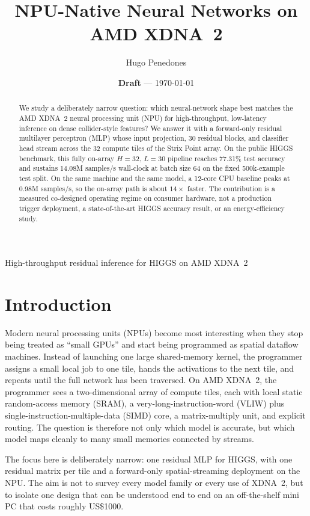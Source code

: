 \documentclass[a4paper,11pt]{article}
\title{NPU-Native Neural Networks on AMD XDNA~2}
\author{Hugo Penedones}
\date{\textbf{Draft} --- \today}
\begin{document}
\maketitle

\begin{center}
\large\color{black!70} High-throughput residual inference for HIGGS on AMD XDNA~2
\end{center}

\begin{abstract}
We study a deliberately narrow question: which neural-network shape best
matches the AMD XDNA~2 neural processing unit (NPU) for high-throughput,
low-latency inference on dense collider-style features? We answer it with a
forward-only residual multilayer perceptron (MLP) whose input projection, 30
residual blocks, and classifier head stream across the 32 compute tiles of the
Strix Point array. On the public HIGGS benchmark, this fully on-array
$H=32$, $L=30$ pipeline reaches 77.31\% test accuracy and sustains 14.08M
samples/s wall-clock at batch size 64 on the fixed 500k-example test split. On
the same machine and the same model, a 12-core CPU baseline peaks at
0.98M samples/s, so the on-array
path is about $14\times$ faster. The contribution is a measured co-designed
operating regime on consumer hardware, not a production trigger deployment, a
state-of-the-art HIGGS accuracy result, or an energy-efficiency study.
\end{abstract}

\section{Introduction}

Modern neural processing units (NPUs) become most interesting when they stop
being treated as ``small GPUs'' and start being programmed as spatial dataflow
machines. Instead of launching one large shared-memory kernel, the programmer
assigns a small local job to one tile, hands the activations to the next tile,
and repeats until the full network has been traversed. On AMD XDNA~2, the
programmer sees a two-dimensional array of compute tiles, each with local
static random-access memory (SRAM), a very-long-instruction-word (VLIW) plus
single-instruction-multiple-data (SIMD) core, a matrix-multiply unit, and
explicit routing. The question is therefore not only which model is accurate,
but which model maps cleanly to many small memories connected by streams.

The focus here is deliberately narrow: one residual MLP for HIGGS, with one
residual matrix per tile and a forward-only spatial-streaming deployment on the
NPU. The aim is not to survey every model family or every use of XDNA~2, but to
isolate one design that can be understood end to end on an off-the-shelf mini
PC that costs roughly US\$1000.
\end{document}
